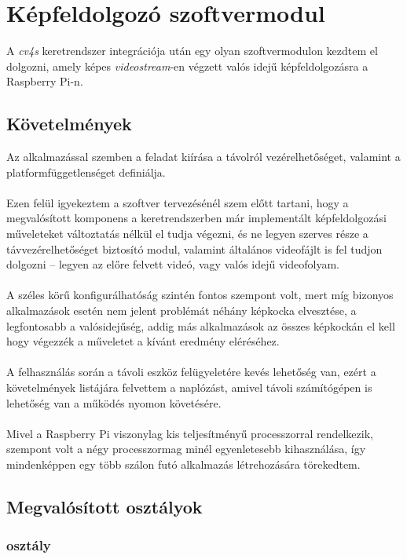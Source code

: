 \chapter{Képfeldolgozó szoftvermodul}

A \emph{cv4s} keretrendszer integrációja után egy olyan szoftvermodulon kezdtem el dolgozni, amely képes \textit{videostream}-en végzett valós idejű képfeldolgozásra a Raspberry Pi-n. 

\section{Követelmények}

Az alkalmazással szemben a feladat kiírása a távolról vezérelhetőséget, valamint a platformfüggetlenséget definiálja. \\
\\
Ezen felül igyekeztem a szoftver tervezésénél szem előtt tartani, hogy a megvalósított komponens a keretrendszerben már implementált képfeldolgozási műveleteket változtatás nélkül el tudja végezni, és ne legyen szerves része a távvezérelhetőséget biztosító modul, valamint általános videofájlt is fel tudjon dolgozni -- legyen az előre felvett videó, vagy valós idejű videofolyam.\\
\\
A széles körű konfigurálhatóság szintén fontos szempont volt, mert míg bizonyos alkalmazások esetén nem jelent problémát néhány képkocka elvesztése, a legfontosabb a valósidejűség, addig más alkalmazások az összes képkockán el kell hogy végezzék a műveletet a kívánt eredmény eléréséhez.\\
\\
A felhasználás során a távoli eszköz felügyeletére kevés lehetőség van, ezért a követelmények listájára felvettem a naplózást, amivel távoli számítógépen is lehetőség van a működés nyomon követésére.\\
\\
Mivel a Raspberry Pi viszonylag kis teljesítményű processzorral rendelkezik, szempont volt a négy processzormag minél egyenletesebb kihasználása, így mindenképpen egy több szálon futó alkalmazás létrehozására törekedtem.

\section{Megvalósított osztályok}

\subsection{ osztály}


